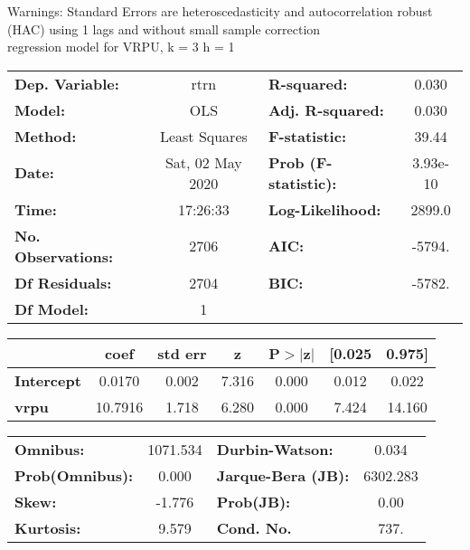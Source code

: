 Warnings: \newline
 [1] Standard Errors are heteroscedasticity and autocorrelation robust (HAC) using 1 lags and without small sample correction\\ 

regression model for VRPU, k = 3 h = 1\begin{center}
\begin{tabular}{lclc}
\toprule
\textbf{Dep. Variable:}    &       rtrn       & \textbf{  R-squared:         } &     0.030   \\
\textbf{Model:}            &       OLS        & \textbf{  Adj. R-squared:    } &     0.030   \\
\textbf{Method:}           &  Least Squares   & \textbf{  F-statistic:       } &     39.44   \\
\textbf{Date:}             & Sat, 02 May 2020 & \textbf{  Prob (F-statistic):} &  3.93e-10   \\
\textbf{Time:}             &     17:26:33     & \textbf{  Log-Likelihood:    } &    2899.0   \\
\textbf{No. Observations:} &        2706      & \textbf{  AIC:               } &    -5794.   \\
\textbf{Df Residuals:}     &        2704      & \textbf{  BIC:               } &    -5782.   \\
\textbf{Df Model:}         &           1      & \textbf{                     } &             \\
\bottomrule
\end{tabular}
\begin{tabular}{lcccccc}
                   & \textbf{coef} & \textbf{std err} & \textbf{z} & \textbf{P$> |$z$|$} & \textbf{[0.025} & \textbf{0.975]}  \\
\midrule
\textbf{Intercept} &       0.0170  &        0.002     &     7.316  &         0.000        &        0.012    &        0.022     \\
\textbf{vrpu}      &      10.7916  &        1.718     &     6.280  &         0.000        &        7.424    &       14.160     \\
\bottomrule
\end{tabular}
\begin{tabular}{lclc}
\textbf{Omnibus:}       & 1071.534 & \textbf{  Durbin-Watson:     } &    0.034  \\
\textbf{Prob(Omnibus):} &   0.000  & \textbf{  Jarque-Bera (JB):  } & 6302.283  \\
\textbf{Skew:}          &  -1.776  & \textbf{  Prob(JB):          } &     0.00  \\
\textbf{Kurtosis:}      &   9.579  & \textbf{  Cond. No.          } &     737.  \\
\bottomrule
\end{tabular}
\end{center}

